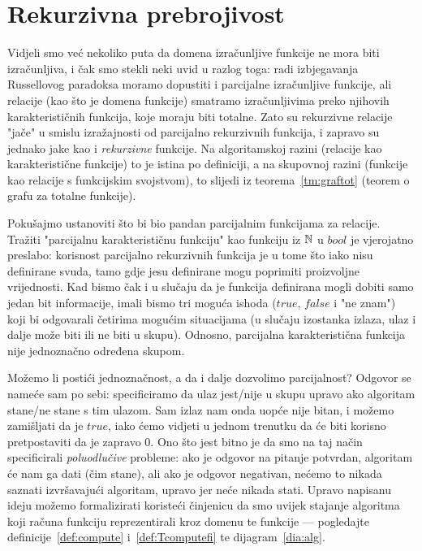 \chapter{Rekurzivna prebrojivost}\label{ch:re}


Vidjeli smo već nekoliko puta da domena izračunljive funkcije ne mora biti izračunljiva, i čak smo stekli neki uvid u razlog toga: radi izbjegavanja Russellovog paradoksa moramo dopustiti i parcijalne izračunljive funkcije, ali relacije (kao što je domena funkcije) smatramo izračunljivima preko njihovih karakterističnih funkcija, koje moraju biti totalne. Zato su rekurzivne relacije "jače" u smislu izražajnosti od parcijalno rekurzivnih funkcija, i zapravo su jednako jake kao i \emph{rekurzivne} funkcije. Na algoritamskoj razini (relacije kao karakteristične funkcije) to je istina po definiciji, a na skupovnoj razini (funkcije kao relacije s funkcijskim svojstvom), to slijedi iz teorema~\ref{tm:graftot} (teorem o grafu za totalne funkcije).

Pokušajmo ustanoviti što bi bio pandan parcijalnim funkcijama za relacije. Tražiti "parcijalnu karakterističnu funkciju" kao funkciju iz ${\mathbb N}$ u $bool$ je vjerojatno preslabo: korisnost parcijalno rekurzivnih funkcija je u tome što iako nisu definirane svuda, tamo gdje jesu definirane mogu poprimiti proizvoljne vrijednosti. Kad bismo čak i u slučaju da je funkcija definirana mogli dobiti samo jedan bit informacije, imali bismo tri moguća ishoda ($\mathit{true}$, $\mathit{false}$ i "ne znam") koji bi odgovarali četirima mogućim situacijama (u slučaju izostanka izlaza, ulaz i dalje može biti ili ne biti u skupu). Odnosno, parcijalna karakteristična funkcija nije jednoznačno određena skupom.

Možemo li postići jednoznačnost, a da i dalje dozvolimo parcijalnost? Odgovor se nameće sam po sebi: specificiramo da ulaz jest\slash nije u skupu upravo ako algoritam stane\slash ne stane s tim ulazom. Sam izlaz nam onda uopće nije bitan, i možemo zamišljati da je $\mathit{true}$, iako ćemo vidjeti u jednom trenutku da će biti korisno pretpostaviti da je zapravo $0$. Ono što jest bitno je da smo na taj način specificirali \emph{poluodlučive} probleme: ako je odgovor na pitanje potvrdan, algoritam će nam ga dati (čim stane), ali ako je odgovor negativan, nećemo to nikada saznati izvršavajući algoritam, upravo jer neće nikada stati. Upravo napisanu ideju možemo formalizirati koristeći činjenicu da smo uvijek stajanje algoritma koji računa funkciju reprezentirali kroz domenu te funkcije --- pogledajte definicije~\ref{def:compute} i~\ref{def:Tcomputefi} te dijagram~\eqref{dia:alg}.

